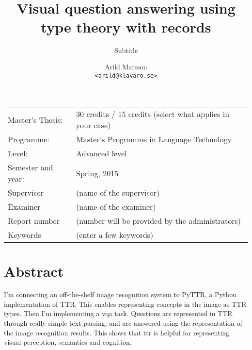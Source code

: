 \documentclass[11pt, a4paper]{article}
\title{Visual question answering using type theory with records}
\subtitle{Subtitle}
\author{Arild Matsson \\ \small\tt <arild@klavaro.se>}
\date{}
\begin{document}
\begin{titlepage}

\maketitle

\vfill

\begingroup
\renewcommand*{\arraystretch}{1.2}
\begin{tabular}{l@{\hskip 20mm}l}
\hline
Master's Thesis: & 30 credits / 15 credits (select what applies in your case)\\
Programme: & Master’s Programme in Language Technology\\
Level: & Advanced level \\
Semester and year: & Spring, 2015\\
Supervisor & (name of the supervisor)\\
Examiner & (name of the examiner)\\
Report number & (number will be provided by the administrators) \\
Keywords & (enter a few keywords) 
\end{tabular}
\endgroup

\thispagestyle{empty}
\end{titlepage}

\newpage
\singlespacing
\section*{Abstract}

I'm connecting an off-the-shelf image recognition system to PyTTR, a Python implementation of TTR.
This enables representing concepts in the image as TTR types.
Then I'm implementing a \gls{vqa} task.
Questions are represented in TTR through really simple text parsing, and are answered using the representation of the image recognition results.
This shows that \gls{ttr} is helpful for representing visual perception, semantics and cognition.
\glsresetall

\thispagestyle{empty}
\end{document}
